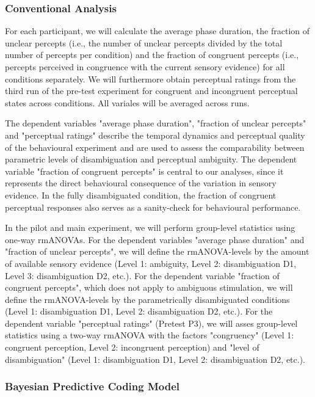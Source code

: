 \documentclass[12pt]{article}
\begin{document}
\subsubsection{Conventional Analysis}

For each participant, we will calculate the average phase duration, the fraction of unclear percepts (i.e., the number of unclear percepts divided by the total number of percepts per condition) and the fraction of congruent percepts (i.e., percepts perceived in congruence with the current sensory evidence) for all conditions separately. We will furthermore obtain perceptual ratings from the third run of the pre-test experiment for congruent and incongruent perceptual states across conditions.  All variales will be averaged across runs.  

The dependent variables "average phase duration", "fraction of unclear percepts" and "perceptual ratings" describe the temporal dynamics and perceptual quality of the behavioural experiment and are used to assess the comparability between parametric levels of disambiguation and perceptual ambiguity. The dependent variable "fraction of congruent percepts" is central to our analyses, since it represents the direct behavioural consequence of the variation in sensory evidence. In the fully disambiguated condition, the fraction of congruent perceptual responses also serves as a sanity-check for behavioural performance.

In the pilot and main experiment, we will perform group-level statistics using one-way rmANOVAs. For the dependent variables "average phase duration" and "fraction of unclear percepts", we will define the rmANOVA-levels by the amount of available sensory evidence (Level 1: ambiguity, Level 2: disambiguation D1, Level 3: disambiguation D2, etc.). For the dependent variable "fraction of congruent percepts", which does not apply to ambiguous stimulation, we will define the rmANOVA-levels by the parametrically disambiguated conditions (Level 1: disambiguation D1, Level 2: disambiguation D2, etc.). For the dependent variable "perceptual ratings" (Pretest P3), we will asses group-level statistics using a two-way rmANOVA with the factors "congruency" (Level 1: congruent perception, Level 2: incongruent perception) and "level of disambiguation" (Level 1: disambiguation D1, Level 2: disambiguation D2, etc.).

\subsubsection{Bayesian Predictive Coding Model}
\end{document}
